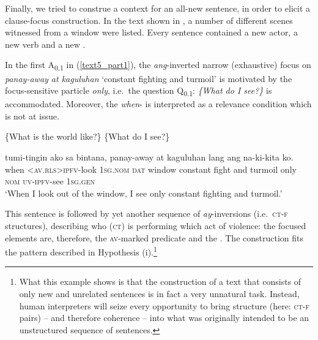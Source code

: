 \documentclass[output=paper,
,modfonts
,nonflat]{langsci/langscibook}
\begin{document}
\noindent Finally, we tried to construe a context for an all-new sentence, in order to elicit a clause-focus construction. In the text shown in , a number of different scenes witnessed from a window were listed. Every sentence contained a new actor, a new verb and a new . 

In the first  A\textsubscript{{0.1}} in (\ref{text5_part1}), the \textit{ang}-inverted narrow (exhaustive) focus on \textit{panay-away at kaguluhan} `constant fighting and turmoil' is motivated by the focus-sensitive particle \textit{only}, i.e.\ the question Q\textsubscript{{0.1}}: \textit{\{What do I see?\}} is accommodated. Moreover, the \textit{when}- is interpreted as a relevance condition which is not at issue. 

\begin{exe}
\ex\label{text5_part1}
\begin{xlist}
 \{What is the world like?\}
 \{What do I see?\}
\end{xlist}
\begin{xlist}[{>}> A\textsubscript{{0.1}}:]
 t{\USSmaller}um{\USGreater}i-tingin ako sa {bintana,{\cb}\nai} {{\ob}{\ob}panay-away} at    {kaguluhan{\cb}\focus} lang    ang    na-ki-kita {ko{\cb}\sq}.\\
{\void{[}when} \textsc{<av.rls>ipfv}-look \textsc{1sg.nom} \textsc{dat} window {\void{[[}constant fight} and turmoil only  \textsc{nom} \textsc{uv-ipfv}-see \textsc{1sg.gen}\\
\glt `When I look out of the window, I see only constant fighting and turmoil.'
\end{xlist}
\end{exe}

\noindent This sentence is followed by yet another  sequence of \textit{ay}-inversions (i.e.\ \textsc{ct-f} structures), describing who \textsc{(ct)} is performing which act of violence:  the focused elements are, therefore, the \textsc{av}-marked predicate and the . The construction fits the pattern described in Hypothesis (i).\footnote{What this example shows is that the construction of a text that consists of only new and unrelated sentences is in fact a very unnatural task. Instead, human interpreters will seize every opportunity to bring structure (here: \textsc{ct-f} pairs) -- and therefore coherence -- into what was originally intended to be an unstructured sequence of sentences.}
\end{document}
